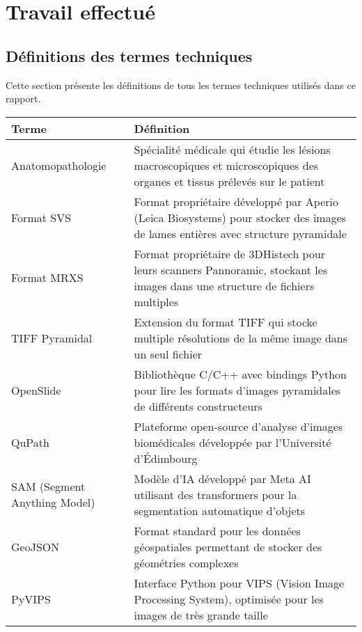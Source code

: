 \documentclass[12pt,a4paper]{report}
\let\oldchapter\chapter
\renewcommand{\chapter}{\clearpage\oldchapter}
\begin{document}
\chapter{Travail effectué}

\section{Définitions des termes techniques}

Cette section présente les définitions de tous les termes techniques utilisés dans ce rapport.

\begin{longtable}{|p{4cm}|p{10cm}|}
\hline
\rowcolor{TableHeaderColor}
\textbf{Terme} & \textbf{Définition} \\
\hline
\endhead

Anatomopathologie & Spécialité médicale qui étudie les lésions macroscopiques et microscopiques des organes et tissus prélevés sur le patient \\
\hline

Format SVS & Format propriétaire développé par Aperio (Leica Biosystems) pour stocker des images de lames entières avec structure pyramidale \\
\hline

Format MRXS & Format propriétaire de 3DHistech pour leurs scanners Pannoramic, stockant les images dans une structure de fichiers multiples \\
\hline

TIFF Pyramidal & Extension du format TIFF qui stocke multiple résolutions de la même image dans un seul fichier \\
\hline

OpenSlide & Bibliothèque C/C++ avec bindings Python pour lire les formats d'images pyramidales de différents constructeurs \\
\hline

QuPath & Plateforme open-source d'analyse d'images biomédicales développée par l'Université d'Édimbourg \\
\hline

SAM (Segment Anything Model) & Modèle d'IA développé par Meta AI utilisant des transformers pour la segmentation automatique d'objets \\
\hline

GeoJSON & Format standard pour les données géospatiales permettant de stocker des géométries complexes \\
\hline

PyVIPS & Interface Python pour VIPS (Vision Image Processing System), optimisée pour les images de très grande taille \\
\hline


\end{longtable}
\end{document}
